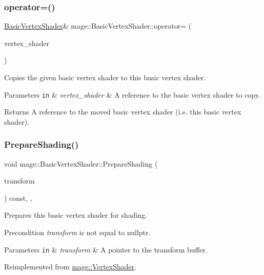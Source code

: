 \subsubsection{\texorpdfstring{operator=()}{operator=()}\hspace{0.1cm}{\footnotesize\ttfamily [2/2]}}
{\footnotesize\ttfamily \hyperlink{classmage_1_1_basic_vertex_shader}{Basic\+Vertex\+Shader}\& mage\+::\+Basic\+Vertex\+Shader\+::operator= (\begin{DoxyParamCaption}\item[{\hyperlink{classmage_1_1_basic_vertex_shader}{Basic\+Vertex\+Shader} \&\&}]{vertex\+\_\+shader }\end{DoxyParamCaption})\hspace{0.3cm}{\ttfamily [delete]}}

Copies the given basic vertex shader to this basic vertex shader.


\begin{DoxyParams}[1]{Parameters}
\mbox{\tt in}  & {\em vertex\+\_\+shader} & A reference to the basic vertex shader to copy. \\
\hline
\end{DoxyParams}
\begin{DoxyReturn}{Returns}
A reference to the moved basic vertex shader (i.\+e. this basic vertex shader). 
\end{DoxyReturn}
\hypertarget{classmage_1_1_basic_vertex_shader_ae565cb19b96591d5d1ff36ac0ff7344c}{}\label{classmage_1_1_basic_vertex_shader_ae565cb19b96591d5d1ff36ac0ff7344c} 
\subsubsection{\texorpdfstring{Prepare\+Shading()}{PrepareShading()}}
{\footnotesize\ttfamily void mage\+::\+Basic\+Vertex\+Shader\+::\+Prepare\+Shading (\begin{DoxyParamCaption}\item[{I\+D3\+D11\+Buffer $\ast$}]{transform }\end{DoxyParamCaption}) const\hspace{0.3cm}{\ttfamily [final]}, {\ttfamily [override]}, {\ttfamily [virtual]}}

Prepares this basic vertex shader for shading.

\begin{DoxyPrecond}{Precondition}
{\itshape transform} is not equal to {\ttfamily nullptr}. 
\end{DoxyPrecond}

\begin{DoxyParams}[1]{Parameters}
\mbox{\tt in}  & {\em transform} & A pointer to the transform buffer. \\
\hline
\end{DoxyParams}


Reimplemented from \hyperlink{classmage_1_1_vertex_shader_a53f4b25241f6c5739724d421c9f29a36}{mage\+::\+Vertex\+Shader}.


